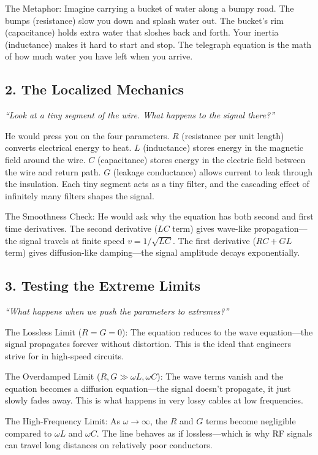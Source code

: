 The Metaphor: Imagine carrying a bucket of water along a bumpy road. The bumps (resistance) slow you down and splash water out. The bucket's rim (capacitance) holds extra water that sloshes back and forth. Your inertia (inductance) makes it hard to start and stop. The telegraph equation is the math of how much water you have left when you arrive.

\subsection*{2. The Localized Mechanics}
\textit{``Look at a tiny segment of the wire. What happens to the signal there?''}

He would press you on the four parameters. $R$ (resistance per unit length) converts electrical energy to heat. $L$ (inductance) stores energy in the magnetic field around the wire. $C$ (capacitance) stores energy in the electric field between the wire and return path. $G$ (leakage conductance) allows current to leak through the insulation. Each tiny segment acts as a tiny filter, and the cascading effect of infinitely many filters shapes the signal.

The Smoothness Check: He would ask why the equation has both second and first time derivatives. The second derivative ($LC$ term) gives wave-like propagation---the signal travels at finite speed $v = 1/\sqrt{LC}$. The first derivative ($RC + GL$ term) gives diffusion-like damping---the signal amplitude decays exponentially.

\subsection*{3. Testing the Extreme Limits}
\textit{``What happens when we push the parameters to extremes?''}

The Lossless Limit ($R = G = 0$): The equation reduces to the wave equation---the signal propagates forever without distortion. This is the ideal that engineers strive for in high-speed circuits.

The Overdamped Limit ($R, G \gg \omega L, \omega C$): The wave terms vanish and the equation becomes a diffusion equation---the signal doesn't propagate, it just slowly fades away. This is what happens in very lossy cables at low frequencies.

The High-Frequency Limit: As $\omega \to \infty$, the $R$ and $G$ terms become negligible compared to $\omega L$ and $\omega C$. The line behaves as if lossless---which is why RF signals can travel long distances on relatively poor conductors.

